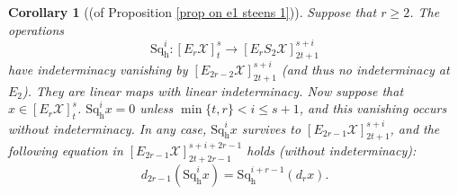 \documentclass[11pt]{amsart} \renewcommand{\baselinestretch}{1.2}
\theoremstyle{plain}
\newtheorem{cor}[thm]{Corollary}
\numberwithin{equation}{section} %
\theoremstyle{plain}
\newtheorem{cor}[thm]{Corollary}
\numberwithin{equation}{chapter} %
\renewcommand{\to}{\longrightarrow}
\newcommand{\calX}{\mathcal{X}}
\newcommand{\calx}{\mathcal{X}}
\newcommand{\Edownup}[5]{[E_{#1}^{#2}#3]^{#4}_{#5}}
\newcommand{\dhor}{_\mathrm{h}}
\newcommand{\Sqh}{\mathrm{Sq}\dhor}
\begin{document}
\begin{Operations on the Bousfield-Kan spectral sequence}
%
%


\begin{cor}[(of Proposition \ref{prop on e1 steens 1})]
\label{prop on e1 steens 1 composed with lift}
Suppose that $r\geq 2$. The operations \[\Sqh^i:\Edownup{r}{}{\calx}{s}{t}\to \Edownup{r}{}{S_2\calx}{s+i}{2t+1}\] have indeterminacy vanishing by $\Edownup{2r-2}{}{\calx}{s+i}{2t+1}$ (and thus no indeterminacy at $E_2$). They are linear maps with linear indeterminacy.
Now suppose that  $x\in\Edownup{r}{}{\calX}{s}{t}$. %
$\Sqh^ix=0$ unless $\min\{t,r\}< i\leq s+1$,  and this vanishing occurs without indeterminacy.
In any case, $\Sqh^ix$ survives to $\Edownup{2r-1}{}{\calX}{s+i}{2t+1}$, and the following equation in $\Edownup{2r-1}{}{\calX}{s+i+2r-1}{2t+2r-1}$ holds (without indeterminacy): \[d_{2r-1}(\Sqh^ix)=\Sqh^{i+r-1}(d_rx).\]


\end{cor}
\end{Operations on the Bousfield-Kan spectral sequence}
\end{document}
